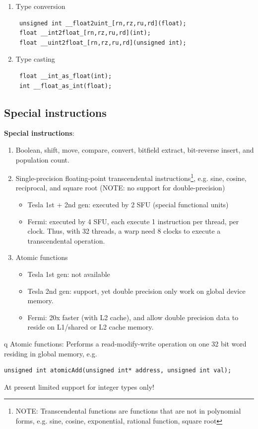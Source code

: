 \begin{enumerate}
\item Type conversion
\begin{lstlisting}
 unsigned int __float2uint_[rn,rz,ru,rd](float);
 float __int2float_[rn,rz,ru,rd](int);
 float __uint2float_[rn,rz,ru,rd](unsigned int);
\end{lstlisting}

\item Type casting
\begin{lstlisting}
 float __int_as_float(int);
 int __float_as_int(float);
\end{lstlisting}
\end{enumerate}

\subsection{Special instructions}
\label{sec:special-instructions}

{\bf Special instructions}:
\begin{enumerate}
\item Boolean, shift, move, compare, convert, bitfield extract,
  bit-reverse insert, and population count.
\item Single-precision floating-point transcendental
  instructions\footnote{NOTE: Transcendental functions are functions
    that are not in polynomial forms, e.g. sine, cosine, exponential,
    rational function, square root},
  e.g. sine, cosine, reciprocal, and square root (NOTE: no support for
  double-precision)
  \begin{itemize}
  \item Tesla 1st + 2nd gen: executed by 2 SFU (special functional units)
  \item Fermi: executed by 4 SFU, each execute 1 instruction per
    thread, per clock. Thus, with 32 threads, a warp need 8 clocks to
    execute a transcendental operation.
  \end{itemize}

\item Atomic functions
  \begin{itemize}
  \item Tesla 1st gen: not available
  \item Tesla 2nd gen: support, yet double precision only work on
    global device memory. 
  \item Fermi: 20x faster (with L2 cache), and allow double precision
    data to reside on L1/shared or L2 cache memory. 
  \end{itemize}
\end{enumerate}q
Atomic functions: Performs a read-modify-write operation on one 32 bit
word residing in global memory, e.g. 
\begin{lstlisting}
unsigned int atomicAdd(unsigned int* address, unsigned int val);
\end{lstlisting}
At present limited support for integer types only!

